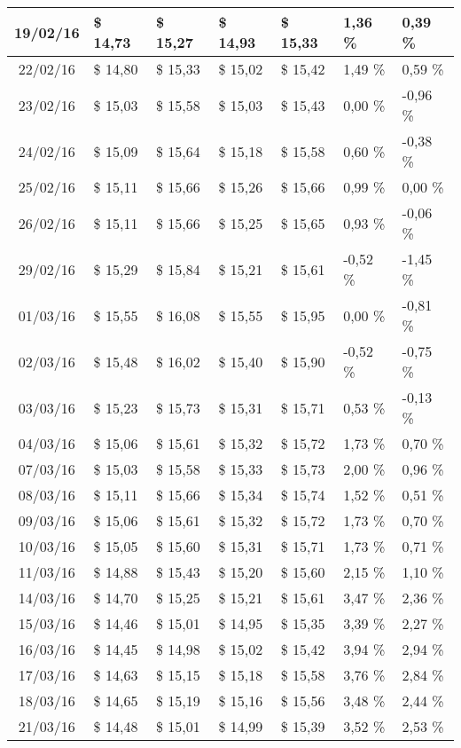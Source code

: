 \begin{center}
\begin{longtable}{|c|p{1.5cm}|p{1.5cm}|p{1.5cm}|p{1.5cm}|p{1.5cm}|p{1.5cm}|}
19/02/16 & \$ 14,73 & \$ 15,27 & \$ 14,93 & \$ 15,33 & 1,36 \% & 0,39 \% \\ \hline
22/02/16 & \$ 14,80 & \$ 15,33 & \$ 15,02 & \$ 15,42 & 1,49 \% & 0,59 \% \\ \hline
23/02/16 & \$ 15,03 & \$ 15,58 & \$ 15,03 & \$ 15,43 & 0,00 \% & -0,96 \% \\ \hline
24/02/16 & \$ 15,09 & \$ 15,64 & \$ 15,18 & \$ 15,58 & 0,60 \% & -0,38 \% \\ \hline
25/02/16 & \$ 15,11 & \$ 15,66 & \$ 15,26 & \$ 15,66 & 0,99 \% & 0,00 \% \\ \hline
26/02/16 & \$ 15,11 & \$ 15,66 & \$ 15,25 & \$ 15,65 & 0,93 \% & -0,06 \% \\ \hline
29/02/16 & \$ 15,29 & \$ 15,84 & \$ 15,21 & \$ 15,61 & -0,52 \% & -1,45 \% \\ \hline
01/03/16 & \$ 15,55 & \$ 16,08 & \$ 15,55 & \$ 15,95 & 0,00 \% & -0,81 \% \\ \hline
02/03/16 & \$ 15,48 & \$ 16,02 & \$ 15,40 & \$ 15,90 & -0,52 \% & -0,75 \% \\ \hline
03/03/16 & \$ 15,23 & \$ 15,73 & \$ 15,31 & \$ 15,71 & 0,53 \% & -0,13 \% \\ \hline
04/03/16 & \$ 15,06 & \$ 15,61 & \$ 15,32 & \$ 15,72 & 1,73 \% & 0,70 \% \\ \hline
07/03/16 & \$ 15,03 & \$ 15,58 & \$ 15,33 & \$ 15,73 & 2,00 \% & 0,96 \% \\ \hline
08/03/16 & \$ 15,11 & \$ 15,66 & \$ 15,34 & \$ 15,74 & 1,52 \% & 0,51 \% \\ \hline
09/03/16 & \$ 15,06 & \$ 15,61 & \$ 15,32 & \$ 15,72 & 1,73 \% & 0,70 \% \\ \hline
10/03/16 & \$ 15,05 & \$ 15,60 & \$ 15,31 & \$ 15,71 & 1,73 \% & 0,71 \% \\ \hline
11/03/16 & \$ 14,88 & \$ 15,43 & \$ 15,20 & \$ 15,60 & 2,15 \% & 1,10 \% \\ \hline
14/03/16 & \$ 14,70 & \$ 15,25 & \$ 15,21 & \$ 15,61 & 3,47 \% & 2,36 \% \\ \hline
15/03/16 & \$ 14,46 & \$ 15,01 & \$ 14,95 & \$ 15,35 & 3,39 \% & 2,27 \% \\ \hline
16/03/16 & \$ 14,45 & \$ 14,98 & \$ 15,02 & \$ 15,42 & 3,94 \% & 2,94 \% \\ \hline
17/03/16 & \$ 14,63 & \$ 15,15 & \$ 15,18 & \$ 15,58 & 3,76 \% & 2,84 \% \\ \hline
18/03/16 & \$ 14,65 & \$ 15,19 & \$ 15,16 & \$ 15,56 & 3,48 \% & 2,44 \% \\ \hline
21/03/16 & \$ 14,48 & \$ 15,01 & \$ 14,99 & \$ 15,39 & 3,52 \% & 2,53 \% \\ \hline

\end{longtable}
\end{center}
